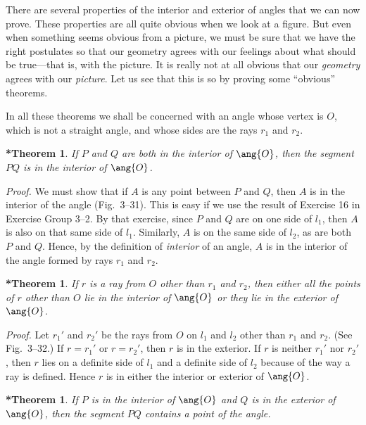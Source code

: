 \documentclass[11pt]{book}
\theoremstyle{bkplain}
\newtheorem{IIIsthm}[theorem]{*Theorem}
\theoremstyle{XIplainnote}
\theoremstyle{bkplain}
\theoremstyle{bkplain}
\begin{document}
There are several properties of the interior and exterior of angles that we can
now prove. These properties are all quite obvious when we look at a figure. But
even when something seems obvious from a picture, we must be sure that we have
the right postulates so that our geometry agrees with our feelings about what
should be true---that is, with the picture. It is really not at all obvious that
our \emph{geometry} agrees with our \emph{picture}. Let us see that this is so by
proving some ``obvious'' theorems.

In all these theorems we shall be concerned with an angle whose vertex is $O$,
which is not a straight angle, and whose sides are the rays $r_1$ and $r_2$.

\begin{IIIsthm}
If $P$ and $Q$ are both in the interior of $\ang{O}$, then the segment $PQ$ is in
the interior of $\ang{O}$.
\end{IIIsthm}

\noindent\emph{Proof.} We must show that if $A$ is any point between $P$ and $Q$,
then $A$ is in the interior of the angle (Fig.~3--31). This is easy if we use the
result of Exercise 16 in Exercise Group 3--2. By that exercise, since $P$ and $Q$
are on one side of $l_1$, then $A$ is also on that same side of $l_1$. Similarly,
$A$ is on the same side of $l_2$, as are both $P$ and $Q$. Hence, by the
definition of \emph{interior} of an angle, $A$ is in the interior of the angle
formed by rays $r_1$ and $r_2$.

\FIGIIITHIRTYONE

\begin{IIIsthm}
If $r$ is a ray from $O$ other than $r_1$ and $r_2$, then either all the points
of $r$ other than $O$ lie in the interior of $\ang{O}$ or they lie in the
exterior of $\ang{O}$.
\end{IIIsthm}

\noindent\emph{Proof.} Let $r_1'$ and $r_2'$ be the rays from $O$ on $l_1$ and
$l_2$ other than $r_1$ and $r_2$. (See Fig.~3--32.) If $r = r_1'$ or
$r = r_2'$, then $r$ is in the exterior. If $r$ is neither $r_1'$ nor $r_2'$,
then $r$ lies on a definite side of $l_1$ and a definite side of $l_2$ because of
the way a ray is defined. Hence $r$ is in either the interior or exterior of
$\ang{O}$.

\FIGIIITHIRTYTWO

\begin{IIIsthm}
If $P$ is in the interior of $\ang{O}$ and $Q$ is in the exterior of $\ang{O}$,
then the segment $PQ$ contains a point of the angle.
\end{IIIsthm}
\end{document}
